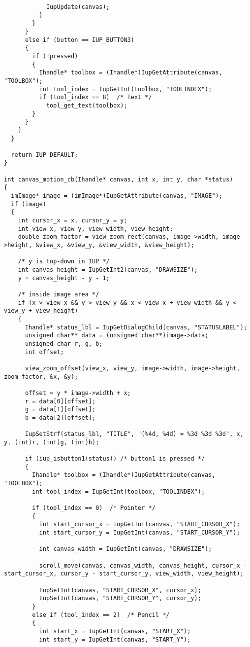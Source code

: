 \documentclass{ctexart}
\begin{document}
\begin{lstlisting}
            IupUpdate(canvas);
          }
        }
      }
      else if (button == IUP_BUTTON3)
      {
        if (!pressed)
        {
          Ihandle* toolbox = (Ihandle*)IupGetAttribute(canvas, "TOOLBOX");
          int tool_index = IupGetInt(toolbox, "TOOLINDEX");
          if (tool_index == 8)  /* Text */
            tool_get_text(toolbox);
        }
      }
    }
  }

  return IUP_DEFAULT;
}

int canvas_motion_cb(Ihandle* canvas, int x, int y, char *status)
{
  imImage* image = (imImage*)IupGetAttribute(canvas, "IMAGE");
  if (image)
  {
    int cursor_x = x, cursor_y = y;
    int view_x, view_y, view_width, view_height;
    double zoom_factor = view_zoom_rect(canvas, image->width, image->height, &view_x, &view_y, &view_width, &view_height);

    /* y is top-down in IUP */
    int canvas_height = IupGetInt2(canvas, "DRAWSIZE");
    y = canvas_height - y - 1;

    /* inside image area */
    if (x > view_x && y > view_y && x < view_x + view_width && y < view_y + view_height)
    {
      Ihandle* status_lbl = IupGetDialogChild(canvas, "STATUSLABEL");
      unsigned char** data = (unsigned char**)image->data;
      unsigned char r, g, b;
      int offset;

      view_zoom_offset(view_x, view_y, image->width, image->height, zoom_factor, &x, &y);

      offset = y * image->width + x; 
      r = data[0][offset];
      g = data[1][offset];
      b = data[2][offset];

      IupSetStrf(status_lbl, "TITLE", "(%4d, %4d) = %3d %3d %3d", x, y, (int)r, (int)g, (int)b);

      if (iup_isbutton1(status)) /* button1 is pressed */
      {
        Ihandle* toolbox = (Ihandle*)IupGetAttribute(canvas, "TOOLBOX");
        int tool_index = IupGetInt(toolbox, "TOOLINDEX");

        if (tool_index == 0)  /* Pointer */
        {
          int start_cursor_x = IupGetInt(canvas, "START_CURSOR_X");
          int start_cursor_y = IupGetInt(canvas, "START_CURSOR_Y");

          int canvas_width = IupGetInt(canvas, "DRAWSIZE");

          scroll_move(canvas, canvas_width, canvas_height, cursor_x - start_cursor_x, cursor_y - start_cursor_y, view_width, view_height);

          IupSetInt(canvas, "START_CURSOR_X", cursor_x);
          IupSetInt(canvas, "START_CURSOR_Y", cursor_y);
        }
        else if (tool_index == 2)  /* Pencil */
        {
          int start_x = IupGetInt(canvas, "START_X");
          int start_y = IupGetInt(canvas, "START_Y");


\end{lstlisting}
\end{document}
